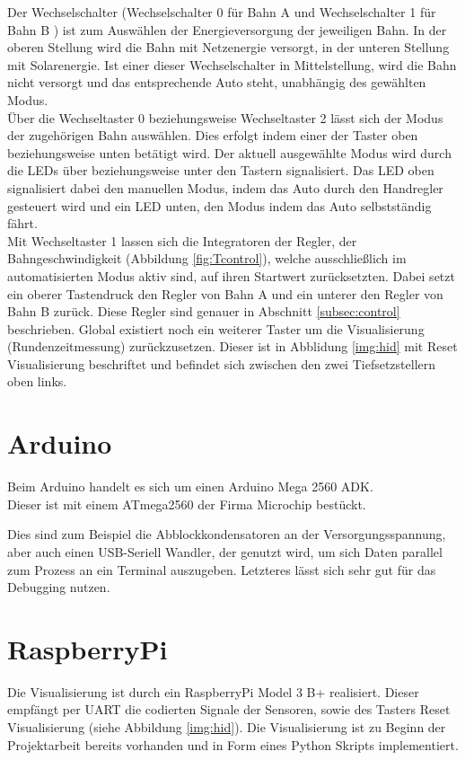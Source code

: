 \documentclass[a4paper, 11pt]{report}
\begin{document}
		Der Wechselschalter (\glqq Wechselschalter 0\grqq{} für Bahn A und \glqq Wechselschalter 1\grqq{} für Bahn B ) ist zum Auswählen der Energieversorgung der jeweiligen Bahn. In der oberen Stellung wird die Bahn mit Netzenergie versorgt, in der unteren Stellung mit Solarenergie. 
Ist einer dieser Wechselschalter in Mittelstellung, wird die Bahn nicht versorgt und das entsprechende Auto steht, unabhängig des gewählten Modus.\\
		Über die Wechseltaster 0 beziehungsweise Wechseltaster 2 lässt sich der Modus der zugehörigen Bahn auswählen. Dies erfolgt indem einer der Taster oben beziehungsweise unten betätigt wird.  Der aktuell ausgewählte Modus wird durch die LEDs über beziehungsweise unter den Tastern signalisiert. Das LED oben signalisiert dabei den manuellen Modus, indem das Auto durch den Handregler gesteuert wird und ein LED unten, den Modus indem das Auto selbstständig fährt.\\
Mit Wechseltaster 1  lassen sich die Integratoren der Regler, der Bahngeschwindigkeit (Abbildung \ref{fig:Tcontrol}), welche ausschließlich im automatisierten Modus aktiv sind, auf ihren Startwert zurücksetzten. Dabei setzt ein oberer Tastendruck den Regler von Bahn A und ein unterer den Regler von Bahn B zurück. Diese Regler sind genauer in Abschnitt \ref{subsec:control} beschrieben.
Global existiert noch ein weiterer Taster um die Visualisierung (Rundenzeitmessung) zurückzusetzen. Dieser ist in Abblidung \ref{img:hid} mit \glqq Reset Visualisierung\grqq{} beschriftet und befindet sich zwischen den zwei Tiefsetzstellern oben links.
	\section{Arduino}
		Beim Arduino handelt es sich um einen Arduino Mega 2560 ADK.\\
		Dieser ist mit einem ATmega2560 der Firma Microchip bestückt.

		Dies sind zum Beispiel die Abblockkondensatoren an der Versorgungsspannung, aber auch einen USB-Seriell Wandler, der genutzt wird, um sich Daten parallel zum Prozess an ein Terminal auszugeben.
		Letzteres lässt sich sehr gut für das Debugging nutzen.

	\section{RaspberryPi}
		Die Visualisierung ist durch ein RaspberryPi Model 3 B+ realisiert. Dieser empfängt per UART die codierten Signale der Sensoren, sowie des Tasters \glqq Reset Visualisierung\grqq{} (siehe Abbildung \ref{img:hid}).
		Die Visualisierung ist zu Beginn der Projektarbeit bereits vorhanden und in Form eines Python Skripts implementiert.
\end{document}
